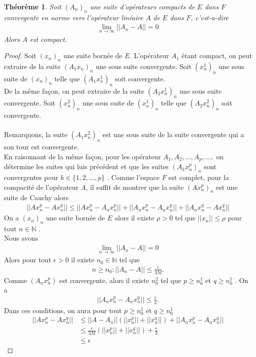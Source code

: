 \documentclass{report}
\newtheorem{The}{Théorème}[subsection]
\begin{document}
{\begin{The} Soit $(A_n)_n$ une suite d'opérateurs compacts de $E$ dans $F$ convergente en norme vers l'opérateur linéaire $A$ de $E$ dans $F$, c'est-a-dire 
									\begin{align*}
							 \lim_{n \to \infty} ||A_n - A|| = 0 
									\end{align*}
Alors $A$ est compact.\\
\end{The}



\begin{proof}
Soit $(x_n)_n$ une suite bornée de $E$. L'opérateur $A_1$ étant compact, on  peut extraire de la suite $(A_1 x_n)_n$ une sous suite convergente. Soit $(x_n^1)_n$ une sous suite de $(x_n)_n$ telle que $(A_1 x_n^1)_n$ soit convergente.\\
De la même façon, on peut extraire de la suite $(A_2 x_n^1)_n$ une sous suite convergente. Soit $(x_n^2)_n$ une sous suite de $(x_n^1)_n$ telle que $(A_2 x_n^2)_n$ soit convergente.\\ \\
Remarquons, la suite $(A_1 x_n^2)_n$ est une sous suite de la suite convergente qui a son tour est convergente.\\
En raisonnant de la même façon, pour les opérateur $A_1, A_2, \ldots, A_p, \ldots,$ on détermine les suites qui luis précédent et que les suites $(A_k x_n^p)_n$ sont convergentes pour $k \in \{1,2,\ldots,p\}$ . Comme l'espace $F$ est complet, pour la compacité de l'opérateur $A$, il suffit de montrer que la suite $(A x_n^p)_n$ est une suite de Cauchy alors
									\begin{align*}
							 ||A x_n^p - A x_n^q|| \le ||A x_n^p - A_n x_n^p|| + ||A_n x_n^p - A_n x_n^q|| + ||A_n x_n^q - A x_n^q|| 
									\end{align*}
On a $(x_n)_n$ une suite bornée de $E$ alors il existe $\rho > 0$ tel que $||x_n|| \le \rho$ pour tout $n \in \mathbb{N}$ .\\
Nous avons 
									\begin{align*}
							 \lim_{n \to \infty} ||A_n - A|| = 0 
									\end{align*}
Alors pour tout $\epsilon > 0$ il existe $n_0 \in \mathbb{N}$ tel que 
									\begin{align*}
							 n \ge n_0 : ||A_n - A|| \le \frac{\epsilon}{3M} .
									\end{align*}
Comme $(A_n x_n^p)$ est convergente, alors il existe $n_0^2$ tel que $p \ge n_0^1$ et $q \ge n_0^1$ . On a 
									\begin{align*}
							 ||A_n x_n^p - A_n x_n^q|| \le \frac{\epsilon}{3} .
									\end{align*}
Dans ces conditions, on aura pour tout $p \ge n_0^1$ et $q \ge n_0^1$ 
									\begin{align*}
							 ||A x_n^p - A x_n^q|| &\le ||A-A_n|| (||x_n^p|| + ||x_n^q||) + ||A_n x_n^p - A_n x_n^q|| \\
							 &\le \frac{\epsilon}{3 M} (||x_n^p|| + ||x_n^q||) + \frac{\epsilon}{3} \\
							 &\le \epsilon 
									\end{align*}
\end{proof}


}
\end{document}
